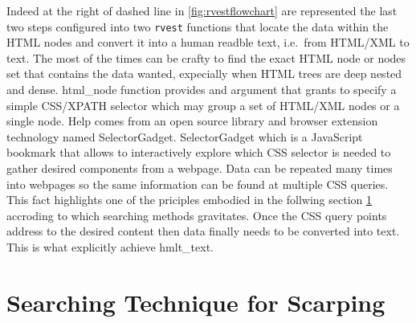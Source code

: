 \documentclass[
  12pt,
  a4paper,
  oneside]{book}
\newcommand{\passthrough}[1]{#1}
\theoremstyle{definition}
\theoremstyle{definition}
\theoremstyle{definition}
\theoremstyle{remark}
\begin{document}
Indeed at the right of dashed line in \ref{fig:rvestflowchart} are represented the last two steps configured into two \passthrough{\lstinline!rvest!}\citep{rvest} functions that locate the data within the HTML nodes and convert it into a human readble text, i.e.~from HTML/XML to text. The most of the times can be crafty to find the exact HTML node or nodes set that contains the data wanted, expecially when HTML trees are deep nested and dense. html\_node function provides and argument that grants to specify a simple CSS/XPATH selector which may group a set of HTML/XML nodes or a single node. Help comes from an open source library and browser extension technology named SelectorGadget. SelectorGadget \citep{Selectorgadget} which is a JavaScript bookmark that allows to interactively explore which CSS selector is needed to gather desired components from a webpage. Data can be repeated many times into webpages so the same information can be found at multiple CSS queries. This fact highlights one of the priciples embodied in the follwing section \ref{ProperScraping} accroding to which searching methods gravitates. Once the CSS query points address to the desired content then data finally needs to be converted into text. This is what explicitly achieve hmlt\_text.

\hypertarget{ProperScraping}{%
\section{Searching Technique for Scarping}\label{ProperScraping}}
\end{document}
